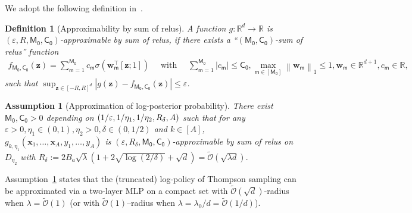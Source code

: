 \documentclass[10pt]{article}
\newtheorem{definition}[theorem]{Definition}
\newtheorem{assumption}{Assumption}
\newcommand{\eps}{\varepsilon}
\newcommand{\<}{\left\langle}
\renewcommand{\>}{\right\rangle}
\newcommand{\trunprob}{{\eta_1}}
\newcommand{\Trunreg}{{D}}
\newcommand{\Trunregpa}{{\eta_2}}  %
\newcommand{\tcO}{{\tilde{\mathcal O}}}
\newcommand{\ssm}{{\mathsf{m}}}
\newcommand{\neuron}{{\mathsf{M_0}}}
\newcommand{\weightn}{{{\mathsf{C_0}}}}
\def\sZ{{\mathbb{Z}}}
\def\bx{{\mathbf x}}
\newcommand{\authnote}[2]{{\scriptsize $\ll$\textsf{#1 notes: #2}$\gg$}}
\newcommand{\authnote}[2]{}
\newcommand{\lc}[1]{{\color{blue}\authnote{Licong}{#1}}}
\begin{document}
We adopt the following definition in~\cite{bai2023transformers}. 
\begin{definition}[Approximability by sum of relus]\label{def:general_mlp_approx_new}
     A function $g: \mathbb{R}^d \rightarrow \mathbb{R}$ is $(\eps, R, \neuron, \weightn)$-approximable by sum of relus, if there exists a ``$(\neuron, \weightn)$-sum of relus'' function
\begin{align*}
f_{\neuron, \weightn}(\mathbf{z})=\sum_{\ssm=1}^\neuron c_\ssm \sigma\left(\mathbf{w}_\ssm^{\top}[\mathbf{z} ; 1]\right) \quad \text { with } \quad \sum_{\ssm=1}^\neuron\left|c_\ssm\right| \leq \weightn, \max _{\ssm \in[\neuron]}\left\|\mathbf{w}_\ssm\right\|_1 \leq 1, \mathbf{w}_\ssm \in \mathbb{R}^{d+1},c_\ssm \in \mathbb{R},~
\end{align*}
such that $\sup _{\mathbf{z} \in[-R, R]^d}\left|g(\mathbf{z})-f_{\neuron,\weightn}(\mathbf{z})\right| \leq \eps$.

\end{definition}



\begin{assumption}[Approximation of log-posterior probability]\label{ass:thompson_mlp_approx_linear}
 There exist  $\neuron,\weightn>0$  depending on $(1/\eps,1/\trunprob,\\1/\Trunregpa,R_\delta,A)$  such that for any $\eps>0,\trunprob\in(0,1),\Trunregpa>0,\delta\in(0,1/2)$ and $k\in[A]$, $g_{k,\trunprob}(\bx_1,\ldots,\bx_A,y_1,\ldots,y_A)$ is $(\eps,R_\delta,\neuron,\weightn)$-approximable by sum of relus on $\Trunreg_\Trunregpa$ with
$
R_\delta:=2B_a\sqrt{\lambda}(1+2\sqrt{\log(2/\delta)}+\sqrt{d})=\tcO(\sqrt{\lambda d}).
$

\end{assumption}
Assumption~\ref{ass:thompson_mlp_approx_linear} states that the (truncated) log-policy of  Thompson sampling  can be approximated via a two-layer MLP on a compact set with  $\tcO(\sqrt{d})$-radius when $\lambda=\tcO(1)$ (or with $\tcO(1)$--radius when $\lambda=\lambda_0/d=\tcO(1/d)$).  %
\end{document}
